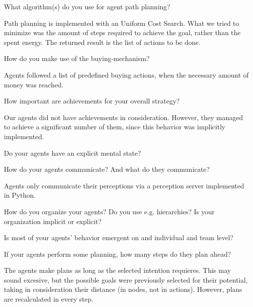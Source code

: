 \begin{question}
What algorithm(s) do you use for agent path planning?  
\end{question}

Path planning is
implemented with an Uniform Cost Search. What we tried to minimize was the
amount of steps required to achieve the goal, rather than the spent energy.
The returned result is the list of actions to be done.

\begin{question}
How do you make use of the buying-mechanism?  
\end{question}

Agents followed a list of
predefined buying actions, when the necessary amount of money was reached.

\begin{question}
How important are achievements for your overall strategy?  
\end{question}

Our agents did
not have achievements in consideration. However, they managed to achieve a
significant number of them, since this behavior was implicitly implemented.

\begin{question}
Do your agents have an explicit mental state?
\end{question}


\begin{question}
How do your agents communicate? And what do they communicate?  
\end{question}

Agents only
communicate their perceptions via a perception server implemented in Python.

\begin{question}
How do you organize your agents? Do you use e.g. hierarchies? Is your
organization implicit or explicit?
\end{question}


\begin{question}
Is most of your agents’ behavior emergent on and individual and team
level?
\end{question}

\begin{question}
If your agents perform some planning, how many steps do they plan ahead?
\end{question}

The agents make plans as long as the selected intention requieres. This may
sound excesive, but the possible goals were previously selected for their
potential, taking in consideration their distance (in nodes, not in actions).
However, plans are recalculated in every step.


